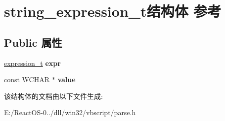 \hypertarget{structstring__expression__t}{}\section{string\+\_\+expression\+\_\+t结构体 参考}
\label{structstring__expression__t}
\subsection*{Public 属性}
\begin{DoxyCompactItemize}
\item 
\mbox{\label{structstring__expression__t_a22c12be5b659f4e2b44b3fa44b5f9b47}} 
\hyperlink{struct__expression__t}{expression\+\_\+t} {\bfseries expr}
\item 
\mbox{\label{structstring__expression__t_aed2735c4fd53eb2e117d1c83e02920a0}} 
const W\+C\+H\+AR $\ast$ {\bfseries value}
\end{DoxyCompactItemize}


该结构体的文档由以下文件生成\+:\begin{DoxyCompactItemize}
\item 
E\+:/\+React\+O\+S-\/0../dll/win32/vbscript/parse.\+h\end{DoxyCompactItemize}
